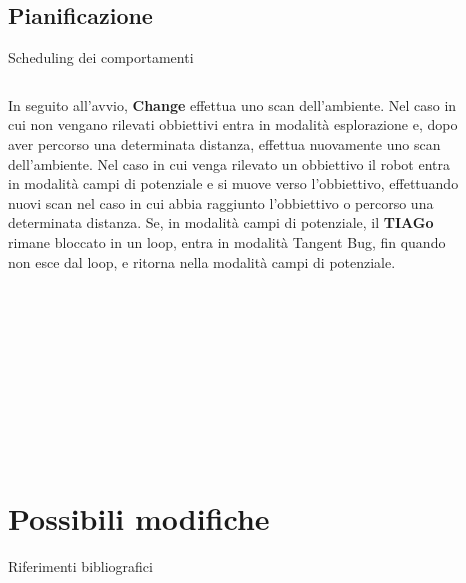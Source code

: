 \documentclass[10pt]{beamer}
\begin{document}
	\subsection{Pianificazione}\label{subsec:Pianificazione}
	\begin{frame}{Scheduling dei comportamenti}
		
		\begin{columns}
			\begin{column}{0.5\textwidth}
				In seguito all'avvio, \textbf{Change} effettua uno scan
				dell'ambiente.  Nel caso in cui non vengano rilevati obbiettivi
				entra in modalità esplorazione e, dopo aver percorso una
				determinata distanza, effettua nuovamente uno scan
				dell'ambiente. Nel caso in cui venga rilevato un obbiettivo il
				robot entra in modalità campi di potenziale e si muove verso
				l'obbiettivo, effettuando nuovi scan nel caso in cui abbia
				raggiunto l'obbiettivo o percorso una determinata
				distanza. Se, in modalità campi di potenziale, il
				\textbf{TIAGo} rimane bloccato in un loop, entra in modalità
				Tangent Bug, fin quando non esce dal loop, e ritorna nella
				modalità campi di potenziale.
			\end{column}
			
			\begin{column}{0.5\textwidth}
				\begin{figure}[H]
					\centering
					\texttt{[image: ./img/fsa.pdf]}
					\label{fig:fsa}
				\end{figure}
			\end{column}
		\end{columns}
	\end{frame}
	
	\section{Possibili modifiche}\label{sec:Possibli-modifiche}
	\frame{\sectionpage}

	\newpage
	
	\begin{frame}[allowframebreaks]{Riferimenti bibliografici}
		
	\end{frame}
\end{document}

